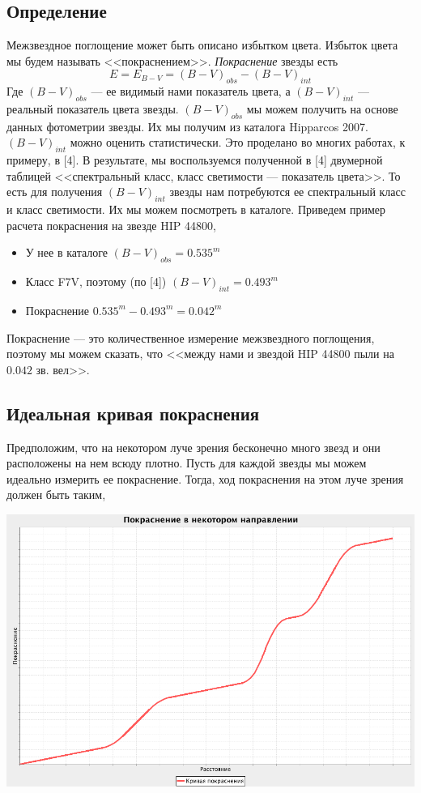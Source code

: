 \documentclass[14pt]{article}
\begin{document}
    
    		\subsection{Определение}
    			Межзвездное поглощение может быть описано избытком цвета. Избыток цвета мы будем называть <<покраснением>>. {\it Покраснение} звезды есть
        		$$
            		E = E_{B - V} = (B - V)_{obs} - (B - V)_{int}    
        		$$ 
        		Где $(B - V)_{obs}$ --- ее видимый нами показатель цвета, а $(B - V)_{int}$ --- реальный показатель цвета звезды. $(B - V)_{obs}$ мы можем получить на основе данных фотометрии звезды. Их мы получим из каталога Hipparcos 2007. $(B - V)_{int}$ можно оценить статистически. Это проделано во многих работах, к примеру, в [4]. В результате, мы воспользуемся полученной в [4] двумерной таблицей <<спектральный класс, класс светимости --- показатель цвета>>. То есть для получения $(B - V)_{int}$ звезды нам потребуются ее спектральный класс и класс светимости. Их мы можем посмотреть в каталоге. Приведем пример расчета покраснения на звезде HIP 44800,
        		\begin{itemize}
            		\item У нее в каталоге $(B - V)_{obs} = 0.535^m$
            		\item Класс F7V, поэтому (по [4]) $(B - V)_{int} = 0.493^m$
            		\item Покраснение $0.535^m - 0.493^m = 0.042^m$
        		\end{itemize}
        		Покраснение --- это количественное измерение межзвездного поглощения, поэтому мы можем сказать, что <<между нами и звездой HIP 44800 пыли на $0.042$ зв. вел>>.
        
        \subsection{Идеальная кривая покраснения}
        		Предположим, что на некотором луче зрения бесконечно много звезд и они расположены на нем всюду плотно. Пусть для каждой звезды мы можем идеально измерить ее покраснение. Тогда, ход покраснения на этом луче зрения должен быть таким,
        		
        		\begin{center}
        			\includegraphics[scale=0.3]{../../presentation/ideal-1-no-tick.png}
			\end{center}        		
        		
\end{document}
